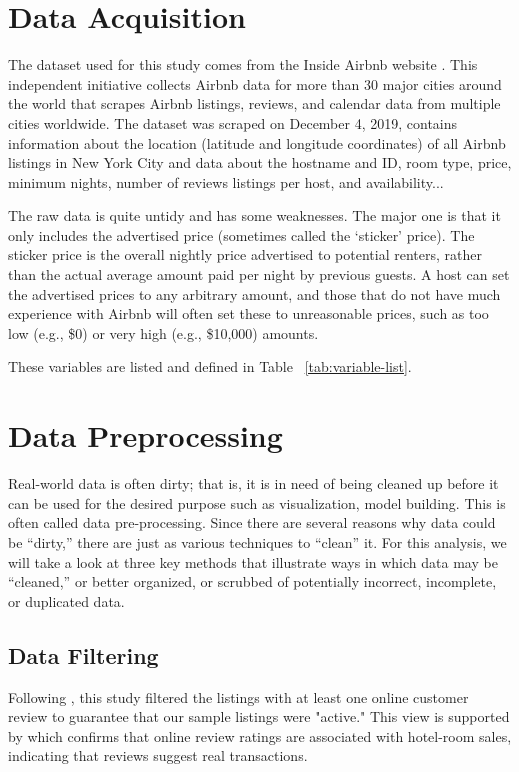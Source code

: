 \section{Data Acquisition}
\label{sec:data_acquisition}

The dataset used for this study comes from the Inside Airbnb website
\textcite{Airbnb}. This independent initiative collects Airbnb data for more than 30
major cities around the world that scrapes Airbnb listings, reviews, and
calendar data from multiple cities worldwide. The dataset  was scraped on
December 4, 2019, contains information about the location (latitude and
longitude coordinates) of all Airbnb listings in New York City and data about
the hostname and ID, room type, price, minimum nights, number of reviews
listings per host, and availability...

The raw data is quite untidy and has some weaknesses. The major one is that it
only includes the advertised price (sometimes called the ‘sticker’ price). The
sticker price is the overall nightly price advertised to potential renters,
rather than the actual average amount paid per night by previous guests. A host
can set the advertised prices to any arbitrary amount, and those that do not
have much experience with Airbnb will often set these to unreasonable prices,
such as too low (e.g., \$0) or very high (e.g., \$10,000) amounts.

These variables are listed and defined in Table ~\ref{tab:variable-list}.

\section{Data Preprocessing }
\label{sec:data_cleaning}

Real-world data is often dirty; that is, it is in need of being cleaned up
before it can be used for the desired purpose such as visualization, model
building. This is often called data pre-processing.
Since there are several reasons why data could be “dirty,” there are just as
various techniques to “clean” it.  For this analysis, we will take a look at
three key methods that illustrate ways in which data may be “cleaned,” or better
organized, or scrubbed of potentially incorrect, incomplete, or duplicated data.

\subsection{Data Filtering}

Following \textcite{wang2017price}, this study filtered the listings with at
least one online customer review to guarantee that our sample listings were
"active." This view is supported by \textcite{ye2009impact}  which confirms that online
review ratings are associated with hotel-room sales, indicating that reviews
suggest real transactions.

